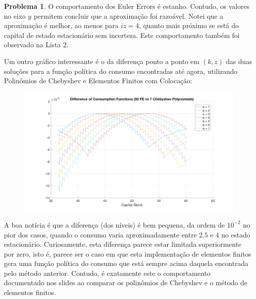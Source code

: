 \documentclass[11pt]{article}
\theoremstyle{definition}
\newtheorem{prob}{Problema}
\theoremstyle{solution}
\begin{document}
\begin{prob}
	O comportamento dos Euler Errors é estanho. Contudo, os valores no eixo $y$ permitem concluir que a aproximação foi razoável. Notei que a aproximação é melhor, ao menos para $iz=4$, quanto mais próximo se está do capital de estado estacionário sem incerteza. Este comportamento também foi observado na Lista 2.
	
	Um outro gráfico interessante é o da diferença ponto a ponto em $(k, z)$ das duas soluções para a função política do consumo encontradas até agora, utilizando Polinômios de Chebyshev e Elementos Finitos com Colocação:
	\begin{figure}[h!]
		\centering
		\includegraphics[scale = 0.17]{cheby_fe}
	\end{figure}
	
	\FloatBarrier
	A boa notícia é que a diferença (dos níveis) é bem pequena, da ordem de $10^{-2}$ no pior dos casos, quando o consumo varia aproximadamente entre $2.5$ e $4$ no estado estacionário. Curiosamente, esta diferença parece estar limitada superiormente por zero, isto é, parece ser o caso em que esta implementação de elementos finitos gera uma função política do consumo que está sempre acima daquela encontrada pelo método anterior. Contudo, é exatamente este o comportamento documentado nos slides ao comparar os polinômios de Chebyshev e o método de elementos finitos.
	

\end{prob}
\end{document}
